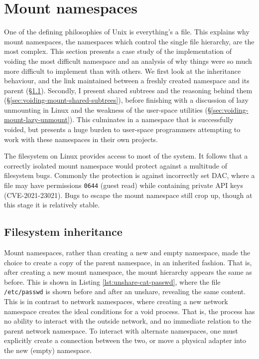 \documentclass[12pt,a4paper,twoside]{report}
\begin{document}
\section{Mount namespaces}
\label{sec:voiding-mount}

One of the defining philosophies of Unix is everything's a file. This explains why mount namespaces, the namespaces which control the single file hierarchy, are the most complex. This section presents a case study of the implementation of voiding the most difficult namespace and an analysis of why things were so much more difficult to implement than with others. We first look at the inheritance behaviour, and the link maintained between a freshly created namespace and its parent (§\ref{sec:voiding-mount-inherited}). Secondly, I present shared subtrees and the reasoning behind them (§\ref{sec:voiding-mount-shared-subtrees}), before finishing with a discussion of lazy unmounting in Linux and the weakness of the user-space utilities (§\ref{sec:voiding-mount-lazy-unmount}). This culminates in a namespace that is successfully voided, but presents a huge burden to user-space programmers attempting to work with these namespaces in their own projects.

The filesystem on Linux provides access to most of the system. It follows that a correctly isolated mount namespace would protect against a multitude of filesystem bugs. Commonly the protection is against incorrectly set DAC, where a file may have permissions \texttt{0644} (guest read) while containing private API keys (CVE-2021-23021). Bugs to escape the mount namespace still crop up, though at this stage it is relatively stable.

\subsection{Filesystem inheritance}
\label{sec:voiding-mount-inherited}
 
Mount namespaces, rather than creating a new and empty namespace, made the choice to create a copy of the parent namespace, in an inherited fashion. That is, after creating a new mount namespace, the mount hierarchy appears the same as before. This is shown in Listing \ref{lst:unshare-cat-passwd}, where the file \texttt{/etc/passwd} is shown before and after an unshare, revealing the same content. This is in contrast to network namespaces, where creating a new network namespace creates the ideal conditions for a void process. That is, the process has no ability to interact with the outside network, and no immediate relation to the parent network namespace. To interact with alternate namespaces, one must explicitly create a connection between the two, or move a physical adapter into the new (empty) namespace.
\end{document}
